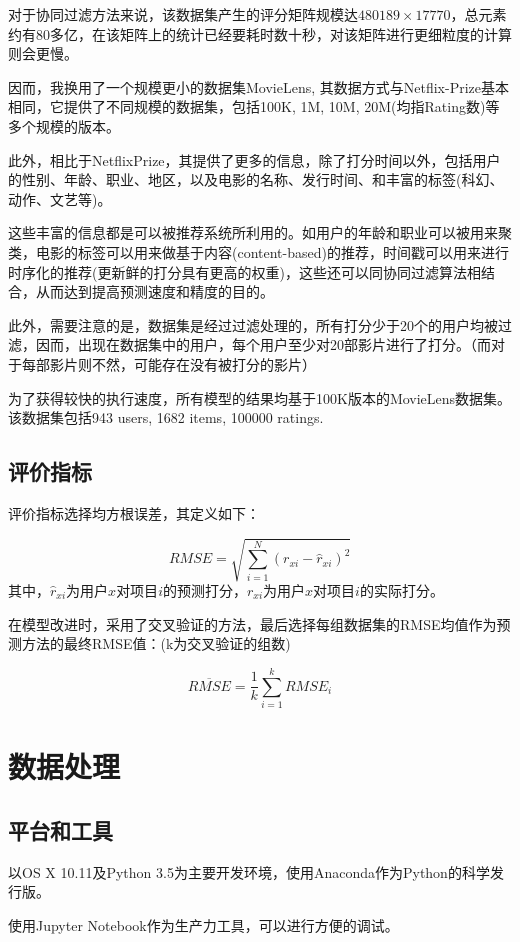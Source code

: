 \documentclass[utf8, a4paper, 11pt, onecolumn]{ctexart}
\begin{document}
\begin{spacing}{1.3}
对于协同过滤方法来说，该数据集产生的评分矩阵规模达$480189 \times 17770$，总元素约有80多亿，在该矩阵上的统计已经要耗时数十秒，对该矩阵进行更细粒度的计算则会更慢。

因而，我换用了一个规模更小的数据集MovieLens, 其数据方式与Netflix-Prize基本相同，它提供了不同规模的数据集，包括100K, 1M, 10M, 20M(均指Rating数)等多个规模的版本。

此外，相比于NetflixPrize，其提供了更多的信息，除了打分时间以外，包括用户的性别、年龄、职业、地区，以及电影的名称、发行时间、和丰富的标签(科幻、动作、文艺等)。

这些丰富的信息都是可以被推荐系统所利用的。如用户的年龄和职业可以被用来聚类，电影的标签可以用来做基于内容(content-based)的推荐，时间戳可以用来进行时序化的推荐(更新鲜的打分具有更高的权重)，这些还可以同协同过滤算法相结合，从而达到提高预测速度和精度的目的。

此外，需要注意的是，数据集是经过过滤处理的，所有打分少于20个的用户均被过滤，因而，出现在数据集中的用户，每个用户至少对20部影片进行了打分。（而对于每部影片则不然，可能存在没有被打分的影片）

为了获得较快的执行速度，所有模型的结果均基于100K版本的MovieLens数据集。该数据集包括943 users, 1682 items, 100000 ratings.

\subsection{评价指标}
\label{评价指标}
评价指标选择均方根误差，其定义如下：

\[RMSE = \sqrt{\sum_{i = 1}^{N}(r_{xi} - \hat{r}_{xi})^{2}}\]
其中，$\hat{r}_{xi}$为用户$x$对项目$i$的预测打分，$r_{xi}$为用户$x$对项目$i$的实际打分。

在模型改进时，采用了交叉验证的方法，最后选择每组数据集的RMSE均值作为预测方法的最终RMSE值：(k为交叉验证的组数)

\[\overline{RMSE} = \frac{1}{k}\sum_{i=1}^{k}RMSE_{i}\]

\section{数据处理}

\subsection{平台和工具}

以OS X 10.11及Python 3.5为主要开发环境，使用Anaconda作为Python的科学发行版。

使用Jupyter Notebook作为生产力工具，可以进行方便的调试。


\end{spacing}
\end{document}
